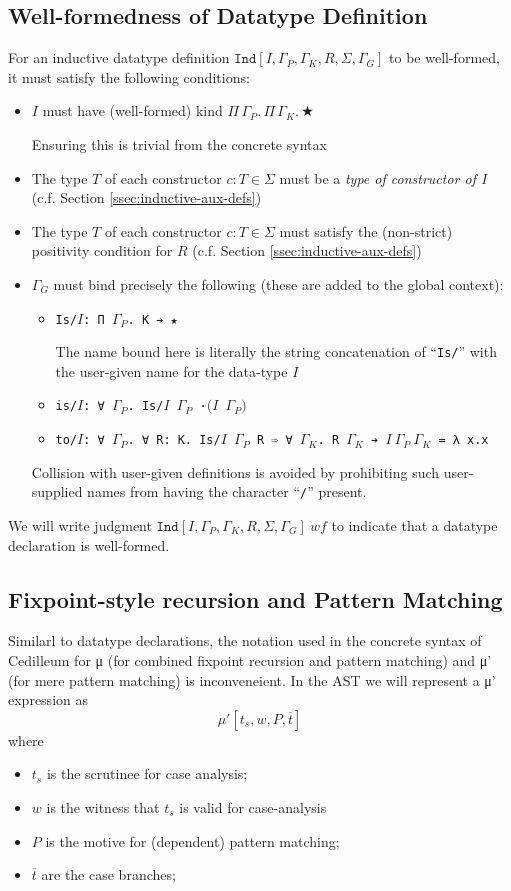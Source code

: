 \documentclass{article}
\newcommand{\ann}[2]{#1\! : \! #2}
\newcommand{\absu}[3]{{#1}\, #2.\, #3}
\newcommand{\indsche}[6]{\texttt{Ind}[#1,#2,#3,#4,#5,#6]}
\newcommand{\mupsche}[4]{μ'[#1,#2,#3,#4]}
\newcommand{\vars}[1]{{\overline{#1}}}
\begin{document}
\subsection{Well-formedness of Datatype Definition}
For an inductive datatype definition
$\indsche{I}{\Gamma_P}{\Gamma_K}{R}{\Sigma}{\Gamma_G}$ to be well-formed, it must satisfy
the following conditions:

\begin{itemize}
\item $I$ must have (well-formed) kind $\absu{\Pi}{\Gamma_P}{\absu{\Pi}{\Gamma_K}{★}}$

  Ensuring this is trivial from the concrete syntax
\item The type $T$ of each constructor $\ann{c}{T} \in \Sigma$ must be a \textit{type of
    constructor of I} (c.f. Section \ref{ssec:inductive-aux-defs})
\item The type $T$ of each constructor $\ann{c}{T} \in \Sigma$ must satisfy the (non-strict)
  positivity condition for $R$ (c.f. Section \ref{ssec:inductive-aux-defs})
\item $\Gamma_G$ must bind precisely the following (these are added to the
  global context):
  \begin{itemize}
  \item \texttt{Is/$I$: Π $\Gamma_P$. K ➔ ★}

    The name bound here is literally the string concatenation of
    ``\texttt{Is/}'' with the user-given name for the data-type $I$
  \item \texttt{is/$I$: ∀ $\Gamma_P$. Is/$I$ $\Gamma_P$ ·$(I$ $\Gamma_P)$}
  \item \texttt{to/$I$: ∀ $\Gamma_P$. ∀ R: K. Is/$I$ $\Gamma_P$ R ➾ ∀
      $\Gamma_K$. R $\Gamma_K$ ➔ $I\ \Gamma_P\ \Gamma_K$ = λ x.x}
  \end{itemize}

  Collision with user-given definitions is avoided by prohibiting such
  user-supplied names from having the character ``\texttt{/}'' present.
\end{itemize}

We will write judgment $\indsche{I}{\Gamma_P}{\Gamma_K}{R}{\Sigma}{\Gamma_G}\ wf$
to indicate that a datatype declaration is well-formed.

\subsection{Fixpoint-style recursion and Pattern Matching}
Similarl to datatype declarations, the notation used in the concrete syntax of
Cedilleum for μ (for combined fixpoint recursion and pattern matching) and μ'
(for mere pattern matching) is inconveneient. In the AST we will represent a μ'
expression as
\[
  \mupsche{t_s}{w}{P}{\vars{t}}
\]
\noindent where
\begin{itemize}
\item $t_s$ is the scrutinee for case analysis;
\item $w$ is the witness that $t_s$ is valid for case-analysis
\item $P$ is the motive for (dependent) pattern matching;
\item $\vars{t}$ are the case branches;
\end{itemize}
\end{document}

